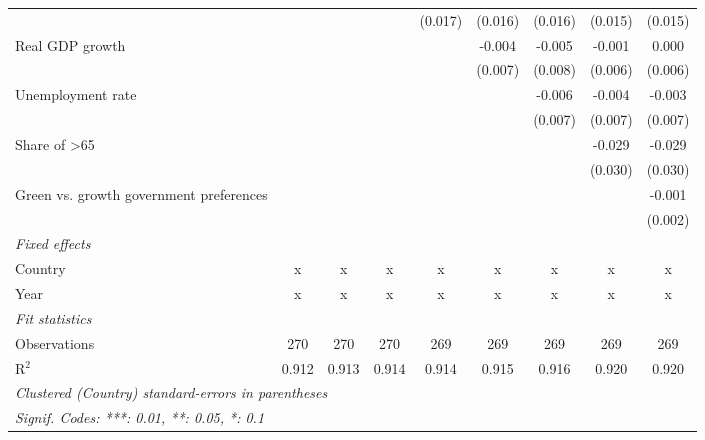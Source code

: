 \begin{table}[htbp]
\begin{tabular}{lcccccccc}
                                              &               &               &         & (0.017) & (0.016) & (0.016) & (0.015) & (0.015)\\   
      Real GDP growth                         &               &               &         &         & -0.004  & -0.005  & -0.001  & 0.000\\   
                                              &               &               &         &         & (0.007) & (0.008) & (0.006) & (0.006)\\   
      Unemployment rate                       &               &               &         &         &         & -0.006  & -0.004  & -0.003\\   
                                              &               &               &         &         &         & (0.007) & (0.007) & (0.007)\\   
      Share of >65                            &               &               &         &         &         &         & -0.029  & -0.029\\   
                                              &               &               &         &         &         &         & (0.030) & (0.030)\\   
      Green vs. growth government preferences &               &               &         &         &         &         &         & -0.001\\   
                                              &               &               &         &         &         &         &         & (0.002)\\   
      \emph{Fixed effects}\\
      Country                                 & x             & x             & x       & x       & x       & x       & x       & x\\  
      Year                                    & x             & x             & x       & x       & x       & x       & x       & x\\  
      \midrule \emph{Fit statistics}\\
      Observations                            & 270           & 270           & 270     & 269     & 269     & 269     & 269     & 269\\  
      R$^2$                                   & 0.912         & 0.913         & 0.914   & 0.914   & 0.915   & 0.916   & 0.920   & 0.920\\  
      \midrule
      \multicolumn{9}{l}{\emph{Clustered (Country) standard-errors in parentheses}}\\
      \multicolumn{9}{l}{\emph{Signif. Codes: ***: 0.01, **: 0.05, *: 0.1}}\\
   \end{tabular}
\end{table}


